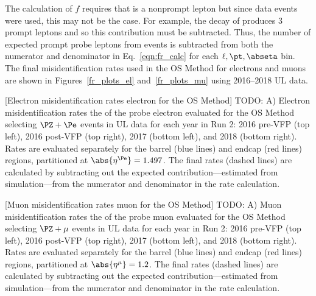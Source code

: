 The calculation of $f$ requires that \looselep is a nonprompt lepton but since data events were used, this may not be the case.
For example, the decay of \WZ produces 3 prompt leptons and so this contribution must be subtracted.
Thus, the number of expected prompt probe leptons from \WZ events is subtracted from both the numerator and denominator in Eq.~\ref{eqn:fr_calc} for each $\ell, \pt, \abseta$ bin.
The final misidentification rates used in the OS Method for electrons and muons are shown in Figures~\ref{fr_plots_el} and~\ref{fr_plots_mu} using 2016--2018 UL data.
\begin{multiFigure}
	\centering
		[Electron misidentification rates \vs electron \pt for the OS Method]
		{TODO:
		\;A)
		Electron misidentification rates \vs the \pt of the probe electron evaluated for the OS Method selecting $\PZ + \Pe$ events in UL data
		for each year in Run 2:
		2016 pre-VFP (top left),
		2016 post-VFP (top right),
		2017 (bottom left), and
		2018 (bottom right).
		Rates are evaluated separately for the barrel (blue lines) and endcap (red lines) regions,
		partitioned at $\abs{\eta^{\Pe}} = 1.497$.
		The final rates (dashed lines) are calculated by subtracting out the expected \WZ contribution---estimated from simulation---from the numerator and denominator in the rate calculation.}
	\label{fr_plots_el}
\end{multiFigure}
\begin{multiFigure}
	\centering
		[Muon misidentification rates \vs muon \pt for the OS Method]
		{TODO:
		\;A) 
		Muon misidentification rates \vs the \pt of the probe muon evaluated for the OS Method selecting $\PZ + \mu$ events in UL data
		for each year in Run 2:
		2016 pre-VFP (top left),
		2016 post-VFP (top right),
		2017 (bottom left), and
		2018 (bottom right).
		Rates are evaluated separately for the barrel (blue lines) and endcap (red lines) regions,
		partitioned at $\abs{\eta^{\mu}} = 1.2$.
		The final rates (dashed lines) are calculated by subtracting out the expected \WZ contribution---estimated from simulation---from the numerator and denominator in the rate calculation.}
	\label{fr_plots_mu}
\end{multiFigure}

